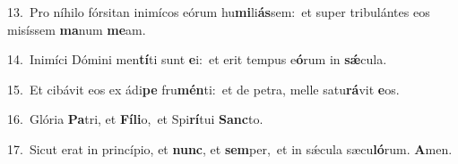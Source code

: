 {\numbfont\textcolor{\numbcolor}{13.}}~Pro níhilo fórsitan inimícos eórum hu\-\textbf{mi}\-li\-\textbf{ás}\-sem:~\star et super tribulántes eos misíssem \textbf{ma}\-num \textbf{me}\-am.\par
{\numbfont\textcolor{\numbcolor}{14.}}~Inimíci Dómini men\-\textbf{tí}\-ti sunt \textbf{e}\-i:~\star et erit tempus e\-\textbf{ó}\-rum in \textbf{sǽ}\-cula.\par
{\numbfont\textcolor{\numbcolor}{15.}}~Et cibávit eos ex ádi\textbf{pe} fru\-\textbf{mén}\-ti:~\star et de petra, melle satu\-\textbf{rá}\-vit \textbf{e}\-os.\par
{\numbfont\textcolor{\numbcolor}{16.}}~Glória \textbf{Pa}\-tri, et \textbf{Fí}\-\textbf{li}o,~\star et Spi\-\textbf{rí}\-tui \textbf{Sanc}\-to.\par
{\numbfont\textcolor{\numbcolor}{17.}}~Sicut erat in princípio, et \textbf{nunc}\-, et \textbf{sem}\-per,~\star et in sǽcula sæcu\-\textbf{ló}\-rum. \textbf{A}\-men.\par
